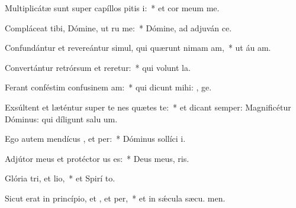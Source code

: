 \item Multiplicátæ sunt super capíllos pitis i:~* et cor meum  me.
\item Compláceat tibi, Dómine, ut ru me:~* Dómine, ad adjuván  ce.
\item Confundántur et revereántur simul, qui quærunt nimam am,~* ut áu am.
\item Convertántur retrórsum et reretur:~* qui volunt  la.
\item Ferant conféstim confusinem am:~* qui dicunt mihi: , ge.
\item Exsúltent et læténtur super te nes quætes te:~* et dicant semper: Magnificétur Dóminus: qui díligunt salu um.
\item Ego autem mendícus , et per:~* Dóminus sollíci  i.
\item Adjútor meus et protéctor us  es:~* Deus meus,  ris.
\item Glória tri, et lio,~* et Spirí to.
\item Sicut erat in princípio, et , et per,~* et in sǽcula sæcu. men.
